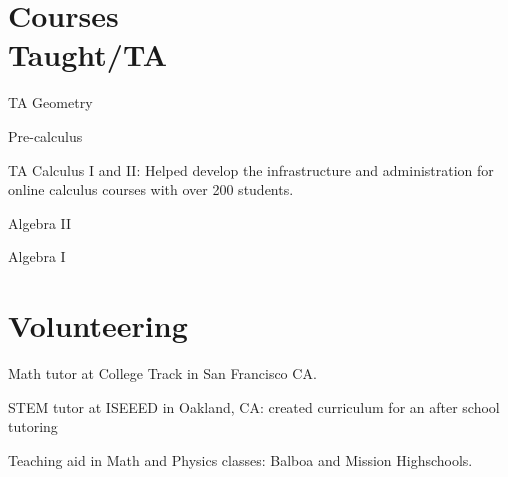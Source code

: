 \section{\sc  Courses \\Taught/TA}
\begin{list1}
\item TA Geometry
\item Pre-calculus 
\item  TA Calculus I and II:  	Helped develop the infrastructure and administration for online calculus courses with over 200 students. 
\item Algebra II
\item Algebra I
\end{list1}

\section{\sc  Volunteering}
\begin{list1}

\item[2015] Math tutor at College Track in San Francisco CA. 
\item[2013] STEM tutor at ISEEED in Oakland, CA: created curriculum for an after school tutoring 
\item[2012] Teaching aid in Math and Physics classes: Balboa and Mission Highschools.

\end{list1}


